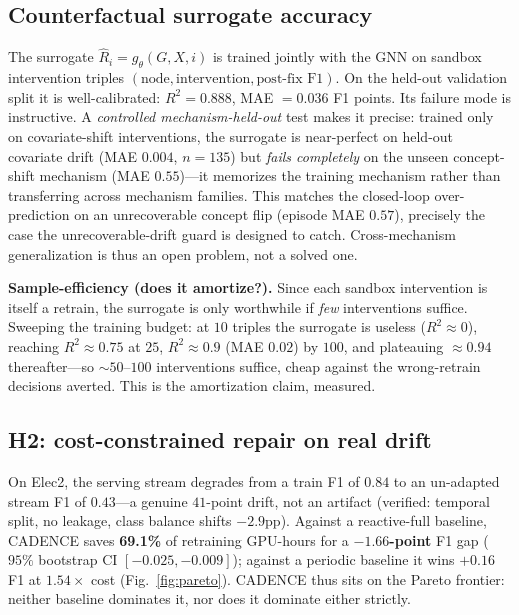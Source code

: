 \documentclass[conference]{IEEEtran}
\begin{document}
\subsection{Counterfactual surrogate accuracy}\label{sec:surrogate}
The surrogate $\hat R_i=g_\theta(G,X,i)$ is trained jointly with the GNN
on sandbox intervention triples $(\text{node},\text{intervention},\text{post-fix F1})$.
On the held-out validation split it is well-calibrated: $R^2=0.888$, MAE
$=0.036$ F1 points. Its failure mode is instructive. A \emph{controlled
mechanism-held-out} test makes it precise: trained only on covariate-shift
interventions, the surrogate is near-perfect on held-out covariate drift
(MAE $0.004$, $n{=}135$) but \emph{fails completely} on the unseen
concept-shift mechanism (MAE $0.55$)---it memorizes the training mechanism
rather than transferring across mechanism families. This matches the
closed-loop over-prediction on an unrecoverable concept flip (episode MAE
$0.57$), precisely the case the unrecoverable-drift guard is designed to
catch. Cross-mechanism generalization is thus an open problem, not a
solved one.

\textbf{Sample-efficiency (does it amortize?).} Since each sandbox
intervention is itself a retrain, the surrogate is only worthwhile if
\emph{few} interventions suffice. Sweeping the training budget: at $10$
triples the surrogate is useless ($R^2\!\approx\!0$), reaching
$R^2\!\approx\!0.75$ at $25$, $R^2\!\approx\!0.9$ (MAE $0.02$) by $100$, and
plateauing $\approx0.94$ thereafter---so $\sim\!50$--$100$ interventions
suffice, cheap against the wrong-retrain decisions averted. This is the
amortization claim, measured.

\subsection{H2: cost-constrained repair on real drift}\label{sec:h2}
On Elec2, the serving stream degrades from a train F1 of $0.84$ to an
un-adapted stream F1 of $0.43$---a genuine $41$-point drift, not an
artifact (verified: temporal split, no leakage, class balance shifts
$-2.9$pp). Against a reactive-full baseline, CADENCE saves \textbf{69.1\%}
of retraining GPU-hours for a \textbf{$-1.66$-point} F1 gap ($95\%$
bootstrap CI $[-0.025,-0.009]$); against a periodic baseline it wins
$+0.16$ F1 at $1.54\times$ cost (Fig.~\ref{fig:pareto}). CADENCE thus sits
on the Pareto frontier: neither baseline dominates it, nor does it
dominate either strictly.
\end{document}
